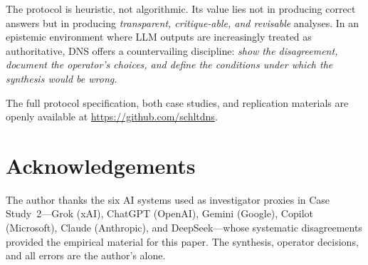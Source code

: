 \documentclass[10pt,a4paper]{article}
\begin{document}
The protocol is heuristic, not algorithmic. Its value lies not in producing correct
answers but in producing \textit{transparent, critique-able, and revisable}
analyses. In an epistemic environment where LLM outputs are increasingly treated
as authoritative, DNS offers a countervailing discipline: \textit{show the
disagreement, document the operator's choices, and define the conditions under
which the synthesis would be wrong.}

The full protocol specification, both case studies, and replication materials
are openly available at \url{https://github.com/schltdns}.

\section*{Acknowledgements}

The author thanks the six AI systems used as investigator proxies in Case
Study~2—Grok (xAI), ChatGPT (OpenAI), Gemini (Google), Copilot (Microsoft),
Claude (Anthropic), and DeepSeek—whose systematic disagreements provided the
empirical material for this paper. The synthesis, operator decisions, and all errors
are the author's alone.



\end{document}
